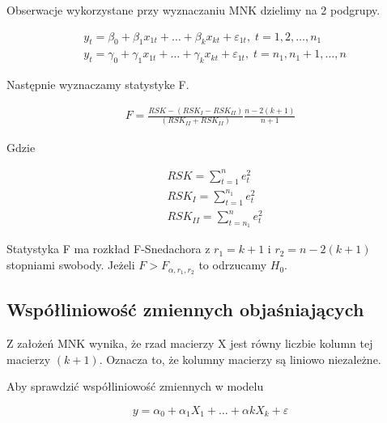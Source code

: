 Obserwacje wykorzystane przy wyznaczaniu MNK dzielimy na 2 podgrupy.

\begin{equation}
    \begin{split}
        &y_t = \beta_0 + \beta_{1}x_{1t} + \dots + \beta_{k}x_{kt} + \varepsilon_{1t}, \;  t= 1,2, \dots , n_1  \\
        &y_t = \gamma_0 + \gamma_{1}x_{1t} + \dots + \gamma_{k}x_{kt} + \varepsilon_{1t}, \;  t= n_1,n_1 +1, \dots , n
    \end{split}
\end{equation}

Następnie wyznaczamy statystyke F.

\begin{equation}
    \begin{split}
        F = \frac{RSK - (RSK_I - RSK_{II})}{(RSK_{II}  + RSK_{II})} \frac{n-2(k+1)}{n+1}
    \end{split}
\end{equation}

Gdzie

\begin{equation}
    \begin{split}
        &RSK = \sum_{t=1}^{n} e_{t}^{2} \\
        &RSK_{I} = \sum_{t=1}^{n_1} e_{t}^{2} \\
        &RSK_{II} = \sum_{t=n_1}^{n} e_{t}^{2}
    \end{split}
\end{equation}

Statystyka F ma rozkład F-Snedachora z \(r_1=k+1 \) i \(r_2= n -2(k+1) \) stopniami swobody.
Jeżeli \( F > F_{\alpha,r_1,r_2} \) to odrzucamy \(H_{0}\).

\subsection{Współliniowość zmiennych objaśniających}\label{subsec:współliniowość-zmiennych-objaśniających}

Z założeń MNK wynika, że rzad macierzy X jest równy liczbie kolumn tej macierzy \((k+1)\).
Oznacza to, że kolumny macierzy są liniowo niezależne.

Aby sprawdzić współliniowość zmiennych w modelu

\begin{equation}
    y = \alpha_{0} + \alpha_{1}X_{1} + \dots + \alpha{k}X_{k} + \varepsilon
\end{equation}

